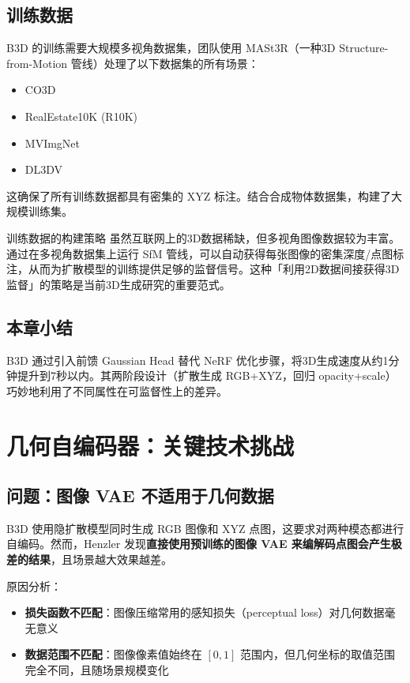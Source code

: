 \documentclass[a4paper]{article}
\begin{document}
\subsection{训练数据}

B3D 的训练需要大规模多视角数据集，团队使用 MASt3R（一种3D Structure-from-Motion 管线）处理了以下数据集的所有场景：

\begin{itemize}
    \item CO3D
    \item RealEstate10K (R10K)
    \item MVImgNet
    \item DL3DV
\end{itemize}

这确保了所有训练数据都具有密集的 XYZ 标注。结合合成物体数据集，构建了大规模训练集。

\begin{knowledgebox}{训练数据的构建策略}
虽然互联网上的3D数据稀缺，但多视角图像数据较为丰富。通过在多视角数据集上运行 SfM 管线，可以自动获得每张图像的密集深度/点图标注，从而为扩散模型的训练提供足够的监督信号。这种「利用2D数据间接获得3D监督」的策略是当前3D生成研究的重要范式。
\end{knowledgebox}

\subsection{本章小结}

B3D 通过引入前馈 Gaussian Head 替代 NeRF 优化步骤，将3D生成速度从约1分钟提升到7秒以内。其两阶段设计（扩散生成 RGB+XYZ，回归 opacity+scale）巧妙地利用了不同属性在可监督性上的差异。

\section{几何自编码器：关键技术挑战}

\subsection{问题：图像 VAE 不适用于几何数据}

B3D 使用隐扩散模型同时生成 RGB 图像和 XYZ 点图，这要求对两种模态都进行自编码。然而，Henzler 发现\textbf{直接使用预训练的图像 VAE 来编解码点图会产生极差的结果}，且场景越大效果越差。

原因分析：
\begin{itemize}
    \item \textbf{损失函数不匹配}：图像压缩常用的感知损失（perceptual loss）对几何数据毫无意义
    \item \textbf{数据范围不匹配}：图像像素值始终在 $[0, 1]$ 范围内，但几何坐标的取值范围完全不同，且随场景规模变化
\end{itemize}
\end{document}
